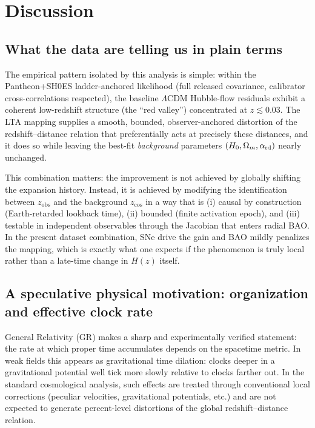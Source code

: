 \documentclass[10pt]{article}
\newcommand{\zobs}{z_{\mathrm{obs}}}
\newcommand{\zcos}{z_{\mathrm{cos}}}
\newcommand{\Hc}{H}
\begin{document}
\section{Discussion}
\label{sec:discussion}

\subsection{What the data are telling us in plain terms}
The empirical pattern isolated by this analysis is simple: within the Pantheon+SH0ES ladder-anchored
likelihood (full released covariance, calibrator cross-correlations respected), the baseline
$\Lambda$CDM Hubble-flow residuals exhibit a coherent low-redshift structure (the ``red valley'')
concentrated at $z\lesssim 0.03$. The LTA mapping supplies a smooth, bounded, observer-anchored
distortion of the redshift--distance relation that preferentially acts at precisely these distances,
and it does so while leaving the best-fit \emph{background} parameters $(H_0,\Omega_m,\alpha_{\rm rd})$
nearly unchanged.

This combination matters: the improvement is not achieved by globally shifting the expansion history.
Instead, it is achieved by modifying the identification between \(\zobs\) and the background
\(\zcos\) in a way that is (i) causal by construction (Earth-retarded lookback time), (ii) bounded
(finite activation epoch), and (iii) testable in independent observables through the Jacobian that
enters radial BAO. In the present dataset combination, SNe drive the gain and BAO mildly penalizes
the mapping, which is exactly what one expects if the phenomenon is truly local rather than a
late-time change in \(\Hc(z)\) itself.

\subsection{A speculative physical motivation: organization and effective clock rate}
\label{sec:discussion_order}

General Relativity (GR) makes a sharp and experimentally verified statement: the rate at which
proper time accumulates depends on the spacetime metric. In weak fields this appears as gravitational
time dilation: clocks deeper in a gravitational potential well tick more slowly relative to clocks
farther out. In the standard cosmological analysis, such effects are treated through conventional
local corrections (peculiar velocities, gravitational potentials, etc.) and are not expected to
generate percent-level distortions of the global redshift--distance relation.
\end{document}
